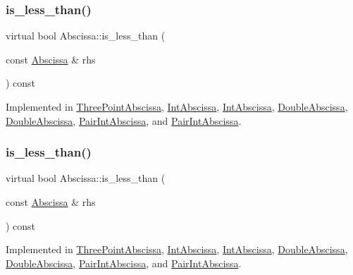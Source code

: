 \subsubsection{\texorpdfstring{is\_less\_than()}{is\_less\_than()}\hspace{0.1cm}{\footnotesize\ttfamily [1/2]}}
{\footnotesize\ttfamily virtual bool Abscissa\+::is\+\_\+less\+\_\+than (\begin{DoxyParamCaption}\item[{const \mbox{\hyperlink{classAbscissa}{Abscissa}} \&}]{rhs }\end{DoxyParamCaption}) const\hspace{0.3cm}{\ttfamily [pure virtual]}}



Implemented in \mbox{\hyperlink{classThreePointAbscissa_a2e0b64a578a1dda361a4ef3dd61f75e8}{Three\+Point\+Abscissa}}, \mbox{\hyperlink{classIntAbscissa_a8aba17c6dc640344c56cd520d6c28be2}{Int\+Abscissa}}, \mbox{\hyperlink{classIntAbscissa_a8aba17c6dc640344c56cd520d6c28be2}{Int\+Abscissa}}, \mbox{\hyperlink{classDoubleAbscissa_acf3a2bfc6b2c43a7a84310943b81849d}{Double\+Abscissa}}, \mbox{\hyperlink{classDoubleAbscissa_acf3a2bfc6b2c43a7a84310943b81849d}{Double\+Abscissa}}, \mbox{\hyperlink{classPairIntAbscissa_ab14bfd8eb2b117045417496b68a77c30}{Pair\+Int\+Abscissa}}, and \mbox{\hyperlink{classPairIntAbscissa_ab14bfd8eb2b117045417496b68a77c30}{Pair\+Int\+Abscissa}}.

\mbox{\label{classAbscissa_a399c2f7a1309368b477c767ff5f63927}} 
\subsubsection{\texorpdfstring{is\_less\_than()}{is\_less\_than()}\hspace{0.1cm}{\footnotesize\ttfamily [2/2]}}
{\footnotesize\ttfamily virtual bool Abscissa\+::is\+\_\+less\+\_\+than (\begin{DoxyParamCaption}\item[{const \mbox{\hyperlink{classAbscissa}{Abscissa}} \&}]{rhs }\end{DoxyParamCaption}) const\hspace{0.3cm}{\ttfamily [pure virtual]}}



Implemented in \mbox{\hyperlink{classThreePointAbscissa_a2e0b64a578a1dda361a4ef3dd61f75e8}{Three\+Point\+Abscissa}}, \mbox{\hyperlink{classIntAbscissa_a8aba17c6dc640344c56cd520d6c28be2}{Int\+Abscissa}}, \mbox{\hyperlink{classIntAbscissa_a8aba17c6dc640344c56cd520d6c28be2}{Int\+Abscissa}}, \mbox{\hyperlink{classDoubleAbscissa_acf3a2bfc6b2c43a7a84310943b81849d}{Double\+Abscissa}}, \mbox{\hyperlink{classDoubleAbscissa_acf3a2bfc6b2c43a7a84310943b81849d}{Double\+Abscissa}}, \mbox{\hyperlink{classPairIntAbscissa_ab14bfd8eb2b117045417496b68a77c30}{Pair\+Int\+Abscissa}}, and \mbox{\hyperlink{classPairIntAbscissa_ab14bfd8eb2b117045417496b68a77c30}{Pair\+Int\+Abscissa}}.

